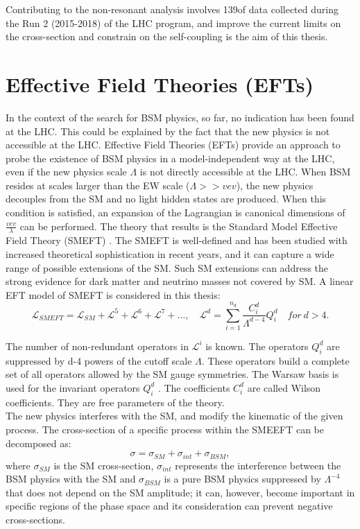 Contributing to the \HHyybb non-resonant analysis involves 139\ifb of data collected during the Run 2 (2015-2018) of the LHC program, and improve the current limits on the cross-section and constrain on the self-coupling is the aim of this thesis. 

\section{Effective Field Theories (EFTs)}
\label{chap1:EFT}
In the context of the search for BSM physics, so far, no indication has been found at the LHC. This could be explained by the fact that the new physics is not accessible at the LHC. Effective Field Theories (EFTs) provide an approach to probe the existence of BSM physics in a model-independent way at the LHC, even if the new physics scale $\Lambda$ is not directly accessible at the LHC. When BSM resides at scales larger than the EW scale ($\Lambda >> vev$), the new physics decouples from the SM and no light hidden states are produced. When this condition is satisfied, an expansion of the Lagrangian is canonical dimensions of $\frac{vev}{\lambda}$ can be performed. The theory that results is the Standard Model Effective Field Theory (SMEFT) \cite{SMEFT_EFT}. The SMEFT is well-defined and has been studied with increased theoretical sophistication in recent years, and it can capture a wide range of possible extensions of the SM. Such SM extensions can address the strong evidence for dark matter and neutrino masses not covered by SM. A linear EFT model of SMEFT is considered in this thesis:  
\begin{equation}
    \mathcal{L}_{S M E F T}=\mathcal{L}_{S M}+\mathcal{L}^{5}+\mathcal{L}^{6}+\mathcal{L}^{7}+\ldots, \quad \mathcal{L}^{d}=\sum_{i=1}^{n_{d}} \frac{C_{i}^{d}}{\Lambda^{d-4}} Q_{i}^{d} \quad for \ d>4.
\end{equation}

The number of non-redundant operators in $\mathcal{L}^i$ is known. The operators $Q_i^d$ are suppressed by d-4 powers of the cutoff scale $\Lambda$. These operators build a complete set of all operators allowed by the SM gauge symmetries. The Warsaw basis is used for the invariant operators $Q_i^d$ \cite{Warsaw}. The coefficients $C_i^d$ are called Wilson coefficients. They are free parameters of the theory. \\
The new physics interferes with the SM, and modify the kinematic of the given process. The cross-section of a specific process within the SMEEFT can be decomposed as: 
\begin{equation}
    \sigma = \sigma_{SM} + \sigma_{int} + \sigma_{BSM},
\end{equation}
where $\sigma_{SM}$ is the SM cross-section, $\sigma_{int}$ represents the interference between the BSM physics with the SM and $\sigma_{BSM}$ is a pure BSM physics suppressed by $\Lambda^{-4}$ that does not depend on the SM amplitude; it can, however, become important in specific regions of the phase space and its consideration can prevent negative cross-sections. \\

